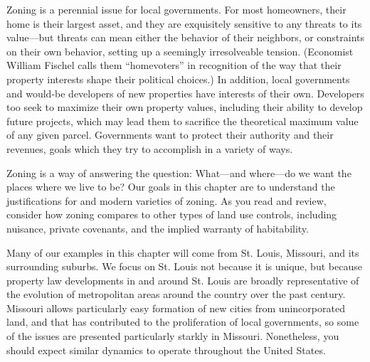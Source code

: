 
Zoning is a perennial issue for local governments. For most homeowners, their
home is their largest asset, and they are exquisitely sensitive to any threats
to its value---but threats can mean either the behavior of their neighbors, or
constraints on their own behavior, setting up a seemingly irresolveable tension.
(Economist William Fischel calls them ``homevoters'' in recognition of the way
that their property interests shape their political choices.) In addition, local
governments and would-be developers of new properties have interests of their
own. Developers too seek to maximize their own property values, including their
ability to develop future projects, which may lead them to sacrifice the
theoretical maximum value of any given parcel. Governments want to protect their
authority and their revenues, goals which they try to accomplish in a variety of
ways.

Zoning is a way of answering the question: What---and where---do we want the
places where we live to be? Our goals in this chapter are to understand the
justifications for and modern varieties of zoning. As you read and review,
consider how zoning compares to other types of land use controls, including
nuisance, private covenants, and the implied warranty of habitability.

Many of our examples in this chapter will come from St. Louis, Missouri, and its
surrounding suburbs. We focus on St. Louis not because it is unique, but because
property law developments in and around St. Louis are broadly representative of
the evolution of metropolitan areas around the country over the past century.
Missouri allows particularly easy formation of new cities from unincorporated
land, and that has contributed to the proliferation of local governments, so
some of the issues are presented particularly starkly in Missouri. Nonetheless,
you should expect similar dynamics to operate throughout the United States.




